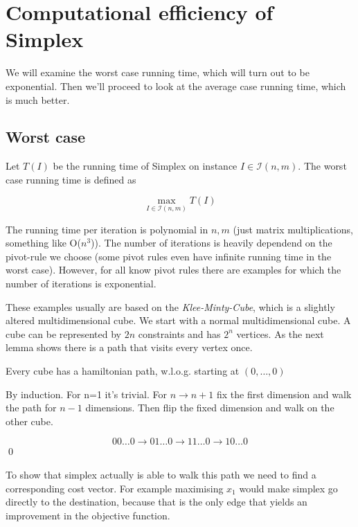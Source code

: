 \section{Computational efficiency of Simplex}

We will examine the worst case running time, which will turn out to be exponential. Then we'll proceed to look at the average case running time, which is much better.

\subsection{Worst case}

\begin{Def} Let $T(I)$ be the running time of Simplex on instance $I\in \mathcal{I}(n,m)$. The worst case running time is defined as

\[\max_{I\in \mathcal{I}(n,m)} T(I)\]
\end{Def}

The running time per iteration is polynomial in $n,m$ (just matrix multiplications, something like O($n^3$)). The number of iterations is heavily dependend on the pivot-rule we choose (some pivot rules even have infinite running time in the worst case). However, for all know pivot rules there are examples for which the number of iterations is exponential.

These examples usually are based on the \emph{Klee-Minty-Cube}, which is a slightly altered multidimensional cube. We start with a normal multidimensional cube. A cube can be represented by $2n$ constraints and has $2^n$ vertices. As the next lemma shows there is a path that visits every vertex once.

\begin{lem} Every cube has a hamiltonian path, w.l.o.g. starting at $(0,\ldots,0)$\end{lem}

\begin{pr} By induction. For n=1 it's trivial. For $n\rightarrow n+1$ fix the first dimension and walk the path for $n-1$ dimensions. Then flip the fixed dimension and walk on the other cube. 

\[00\ldots0 \rightarrow 01\ldots0 \rightarrow 11\ldots 0 \rightarrow 10\ldots0\]
\qed \end{pr}

To show that simplex actually is able to walk this path we need to find a corresponding cost vector. For example maximising $x_1$ would make simplex go directly to the destination, because that is the only edge that yields an improvement in the objective function. 

